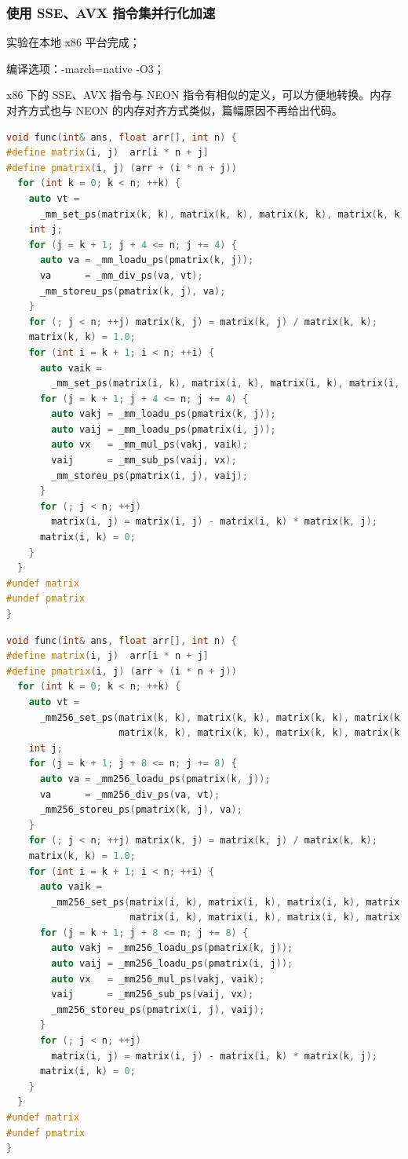 \documentclass[a4paper]{article}
\begin{document}
\subsubsection{使用 SSE、AVX 指令集并行化加速}

实验在本地 x86 平台完成；

编译选项：-march=native -O3；

x86 下的 SSE、AVX 指令与 NEON 指令有相似的定义，可以方便地转换。内存对齐方式也与 NEON 的内存对齐方式类似，篇幅原因不再给出代码。

\begin{lstlisting}[title=SSE 内存未对齐算法,frame=trbl,language={C++}]
void func(int& ans, float arr[], int n) {
#define matrix(i, j)  arr[i * n + j]
#define pmatrix(i, j) (arr + (i * n + j))
  for (int k = 0; k < n; ++k) {
    auto vt =
      _mm_set_ps(matrix(k, k), matrix(k, k), matrix(k, k), matrix(k, k));
    int j;
    for (j = k + 1; j + 4 <= n; j += 4) {
      auto va = _mm_loadu_ps(pmatrix(k, j));
      va      = _mm_div_ps(va, vt);
      _mm_storeu_ps(pmatrix(k, j), va);
    }
    for (; j < n; ++j) matrix(k, j) = matrix(k, j) / matrix(k, k);
    matrix(k, k) = 1.0;
    for (int i = k + 1; i < n; ++i) {
      auto vaik =
        _mm_set_ps(matrix(i, k), matrix(i, k), matrix(i, k), matrix(i, k));
      for (j = k + 1; j + 4 <= n; j += 4) {
        auto vakj = _mm_loadu_ps(pmatrix(k, j));
        auto vaij = _mm_loadu_ps(pmatrix(i, j));
        auto vx   = _mm_mul_ps(vakj, vaik);
        vaij      = _mm_sub_ps(vaij, vx);
        _mm_storeu_ps(pmatrix(i, j), vaij);
      }
      for (; j < n; ++j)
        matrix(i, j) = matrix(i, j) - matrix(i, k) * matrix(k, j);
      matrix(i, k) = 0;
    }
  }
#undef matrix
#undef pmatrix
}
\end{lstlisting}

\begin{lstlisting}[title=AVX 内存未对齐算法,frame=trbl,language={C++}]
void func(int& ans, float arr[], int n) {
#define matrix(i, j)  arr[i * n + j]
#define pmatrix(i, j) (arr + (i * n + j))
  for (int k = 0; k < n; ++k) {
    auto vt =
      _mm256_set_ps(matrix(k, k), matrix(k, k), matrix(k, k), matrix(k, k),
                    matrix(k, k), matrix(k, k), matrix(k, k), matrix(k, k));
    int j;
    for (j = k + 1; j + 8 <= n; j += 8) {
      auto va = _mm256_loadu_ps(pmatrix(k, j));
      va      = _mm256_div_ps(va, vt);
      _mm256_storeu_ps(pmatrix(k, j), va);
    }
    for (; j < n; ++j) matrix(k, j) = matrix(k, j) / matrix(k, k);
    matrix(k, k) = 1.0;
    for (int i = k + 1; i < n; ++i) {
      auto vaik =
        _mm256_set_ps(matrix(i, k), matrix(i, k), matrix(i, k), matrix(i, k),
                      matrix(i, k), matrix(i, k), matrix(i, k), matrix(i, k));
      for (j = k + 1; j + 8 <= n; j += 8) {
        auto vakj = _mm256_loadu_ps(pmatrix(k, j));
        auto vaij = _mm256_loadu_ps(pmatrix(i, j));
        auto vx   = _mm256_mul_ps(vakj, vaik);
        vaij      = _mm256_sub_ps(vaij, vx);
        _mm256_storeu_ps(pmatrix(i, j), vaij);
      }
      for (; j < n; ++j)
        matrix(i, j) = matrix(i, j) - matrix(i, k) * matrix(k, j);
      matrix(i, k) = 0;
    }
  }
#undef matrix
#undef pmatrix
}
\end{lstlisting}
\end{document}
